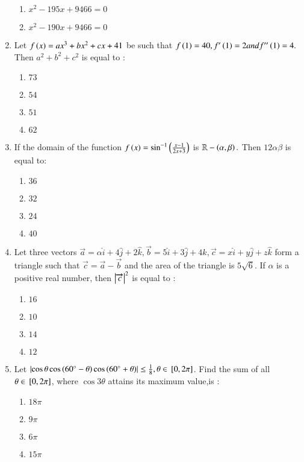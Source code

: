 \documentclass[journal,12pt,onecolumn]{IEEEtran}
\theoremstyle{remark}
\begin{document}
\begin{enumerate}
\begin{enumerate}
     \item $x^2-195x+9466=0$
     \item $x^2-190x+9466=0$
     \end{enumerate}
\item Let $f\left(x\right)=ax^3+bx^2+cx+41$ be such that $f\left(1\right)=40, f'\left(1\right)=2 and f''\left(1\right)=4.$ Then $a^2+b^2+c^2$ is equal to :
     \begin{enumerate}
     \item $73$ \item $54$ \item $51$ \item $62$
     \end{enumerate}
\item If the domain of the function $f\left(x\right)=\sin ^{-1} \left(\frac{x-1}{2x+3}\right)$ is $\mathbb{R}-\left(\alpha,\beta\right).$ Then $12\alpha \beta$ is equal to:
     \begin{enumerate}
     \item $36$ \item $32$ \item $24$ \item $40$
     \end{enumerate}
\item Let three vectors $\overrightarrow{a}=\alpha \hat{i}+4\hat{j}+2\hat{k},\overrightarrow{b}=5\hat{i}+3\hat{j}+4\hat{k},\overrightarrow{c}=x\hat{i}+y\hat{j}+z\hat{k}$ form a triangle such that $\overrightarrow{c}=\overrightarrow{a}-\overrightarrow{b}$ and the area of the triangle is $5\sqrt{6}$. If $\alpha$ is a positive real number, then $\left\vert\overrightarrow{c}\right\vert^2$ is equal to :
     \begin{enumerate}
     \item $16$ \item $10$ \item $14$ \item $12$
     \end{enumerate}
\item Let $\left\vert\cos \theta \cos \left(60^{\circ} -\theta\right) \cos \left(60^{\circ} + \theta\right)\right\vert \leq \frac{1}{8}, \theta \in {}\left[0,2\pi\right]$. Find the sum of  all $\theta \in {}\left[0,2\pi\right]$, where $\cos 3 \theta $ attains its maximum value,is :
     \begin{enumerate}
     \item $18\pi$ \item $9\pi$ \item $6\pi$ \item $15\pi$
     \end{enumerate}

\end{enumerate}
\end{document}
